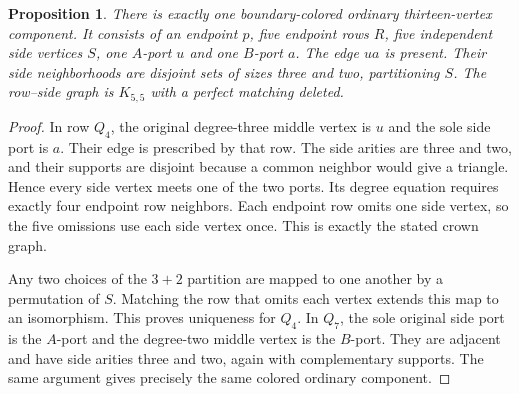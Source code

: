 \documentclass[11pt]{article}
\newtheorem{proposition}[theorem]{Proposition}
\begin{document}
\begin{proposition}\label{thirteen}
There is exactly one boundary-colored ordinary thirteen-vertex component.
It consists of an endpoint $p$, five endpoint rows $R$, five independent
side vertices $S$, one $A$-port $u$ and one $B$-port $a$. The edge $ua$
is present. Their side neighborhoods are disjoint sets of sizes three
and two, partitioning $S$. The row--side graph is $K_{5,5}$ with a
perfect matching deleted.
\end{proposition}
\begin{proof}
In row $Q_4$, the original degree-three middle vertex is $u$ and the
sole side port is $a$. Their edge is prescribed by that row. The side
arities are three and two, and their supports are disjoint because a
common neighbor would give a triangle. Hence every side vertex meets
one of the two ports. Its degree equation requires exactly four endpoint
row neighbors. Each endpoint row omits one side vertex, so the five
omissions use each side vertex once. This is exactly the stated crown
graph.

Any two choices of the $3+2$ partition are mapped to one another by a
permutation of $S$. Matching the row that omits each vertex extends this
map to an isomorphism. This proves uniqueness for $Q_4$. In $Q_7$, the
sole original side port is the $A$-port and the degree-two middle vertex
is the $B$-port. They are adjacent and have side arities three and two,
again with complementary supports. The same argument gives precisely
the same colored ordinary component.
\end{proof}
\end{document}
